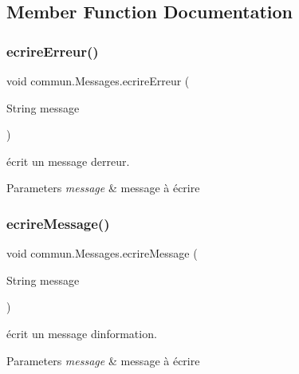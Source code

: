 \subsection{Member Function Documentation}
\mbox{\label{classcommun_1_1Messages_a73671f6e67c65f0c63ac3a88bc9d9c68}} 
\subsubsection{\texorpdfstring{ecrire\+Erreur()}{ecrireErreur()}}
{\footnotesize\ttfamily void commun.\+Messages.\+ecrire\+Erreur (\begin{DoxyParamCaption}\item[{String}]{message }\end{DoxyParamCaption})\hspace{0.3cm}{\ttfamily [inline]}}



écrit un message d\textquotesingle{}erreur. 


\begin{DoxyParams}{Parameters}
{\em message} & message à écrire \\
\hline
\end{DoxyParams}
\mbox{\label{classcommun_1_1Messages_a73b88c0e0beb3741f20c5d51537cc427}} 
\subsubsection{\texorpdfstring{ecrire\+Message()}{ecrireMessage()}}
{\footnotesize\ttfamily void commun.\+Messages.\+ecrire\+Message (\begin{DoxyParamCaption}\item[{String}]{message }\end{DoxyParamCaption})\hspace{0.3cm}{\ttfamily [inline]}}



écrit un message d\textquotesingle{}information. 


\begin{DoxyParams}{Parameters}
{\em message} & message à écrire \\
\hline
\end{DoxyParams}
\mbox{\label{classcommun_1_1Messages_a6bcea8789efaf25afeb2614c99e888de}} 
